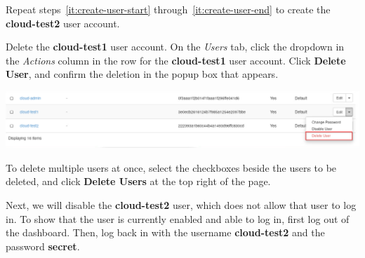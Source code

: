 \documentclass[letterpaper, 12pt]{article}
\begin{document}
\begin{enumerate}
    \begin{labstep}
        Repeat steps~\ref{it:create-user-start} through~\ref{it:create-user-end} to create the \textbf{cloud-test2} user account.
    \end{labstep}

    \begin{labstep}
        Delete the \textbf{cloud-test1} user account.
        On the \textit{Users} tab, click the dropdown in the \textit{Actions} column in the row for the \textbf{cloud-test1} user account.
        Click \textbf{Delete User}, and confirm the deletion in the popup box that appears.

        \begin{center}
            \includegraphics[width=\linewidth]{images/part3/step9.png}
        \end{center}
    \end{labstep}

    \begin{tipbox}
        To delete multiple users at once, select the checkboxes beside the users to be deleted, and click \textbf{Delete Users} at the top right of the page.
    \end{tipbox}

    \begin{labstep}
        Next, we will disable the \textbf{cloud-test2} user, which does not allow that user to log in.
        To show that the user is currently enabled and able to log in, first log out of the dashboard.
        Then, log back in with the username \textbf{cloud-test2} and the password \textbf{secret}.


\end{labstep}
\end{enumerate}
\end{document}
